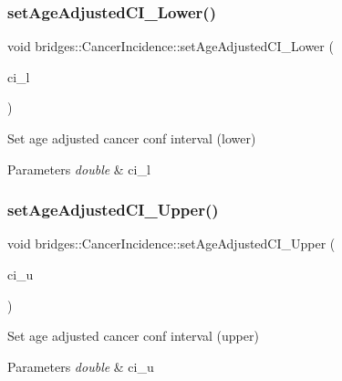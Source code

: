 \subsubsection{\texorpdfstring{setAgeAdjustedCI\_Lower()}{setAgeAdjustedCI\_Lower()}}
{\footnotesize\ttfamily void bridges\+::\+Cancer\+Incidence\+::set\+Age\+Adjusted\+C\+I\+\_\+\+Lower (\begin{DoxyParamCaption}\item[{double}]{ci\+\_\+l }\end{DoxyParamCaption})\hspace{0.3cm}{\ttfamily [inline]}}

Set age adjusted cancer conf interval (lower)


\begin{DoxyParams}{Parameters}
{\em double} & ci\+\_\+l \\
\hline
\end{DoxyParams}
\mbox{\label{classbridges_1_1_cancer_incidence_abd120d1ca536223aa41f25de79eef31d}} 
\subsubsection{\texorpdfstring{setAgeAdjustedCI\_Upper()}{setAgeAdjustedCI\_Upper()}}
{\footnotesize\ttfamily void bridges\+::\+Cancer\+Incidence\+::set\+Age\+Adjusted\+C\+I\+\_\+\+Upper (\begin{DoxyParamCaption}\item[{double}]{ci\+\_\+u }\end{DoxyParamCaption})\hspace{0.3cm}{\ttfamily [inline]}}

Set age adjusted cancer conf interval (upper)


\begin{DoxyParams}{Parameters}
{\em double} & ci\+\_\+u \\
\hline
\end{DoxyParams}
\mbox{\label{classbridges_1_1_cancer_incidence_a607a50050fdfb75a737a684096046abf}} 
